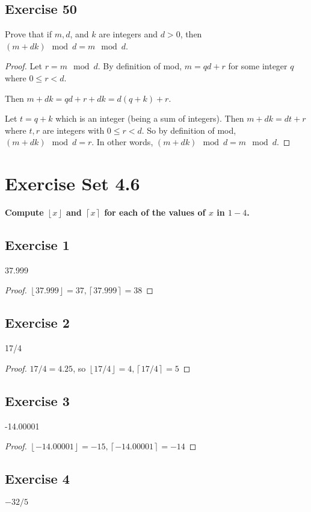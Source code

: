 \documentclass[14pt]{extarticle}
\newcommand{\cy}{\color{cyan}}
\newcommand{\floor}[1]{{\left\lfloor#1\right\rfloor}}
\newcommand{\ceil}[1]{{\left\lceil#1\right\rceil}}
\begin{document}
\subsection{Exercise 50}
Prove that if $m, d$, and $k$ are integers and $d > 0$, then $(m + dk) \mod d = m \mod d$.

\begin{proof}
    Let $r = m \mod d$. By definition of mod, $m = qd+r$ for some integer $q$ where $0 \leq r < d$.

    Then $m + dk = qd+r+dk = d(q+k)+r$.

    Let $t = q+k$ which is an integer (being a sum of integers). Then $m+dk = dt + r$ where $t,r$ are integers with $0 \leq r < d$. So by definition of mod, $(m+dk) \mod d = r$. In other words, $(m + dk) \mod d = m \mod d$.
\end{proof}

\section{Exercise Set 4.6}
 {\bf \cy Compute $\floor{x}$ and $\ceil{x}$ for each of the values of $x$ in $1-4$.}

\subsection{Exercise 1}
37.999

\begin{proof}
    $\floor{37.999} = 37, \ceil{37.999} = 38$
\end{proof}

\subsection{Exercise 2}
17/4

\begin{proof}
    $17/4 = 4.25$, so $\floor{17/4} = 4, \ceil{17/4} = 5$
\end{proof}

\subsection{Exercise 3}
-14.00001

\begin{proof}
    $\floor{-14.00001} = -15, \ceil{-14.00001} = -14$
\end{proof}

\subsection{Exercise 4}
$-32/5$
\end{document}
